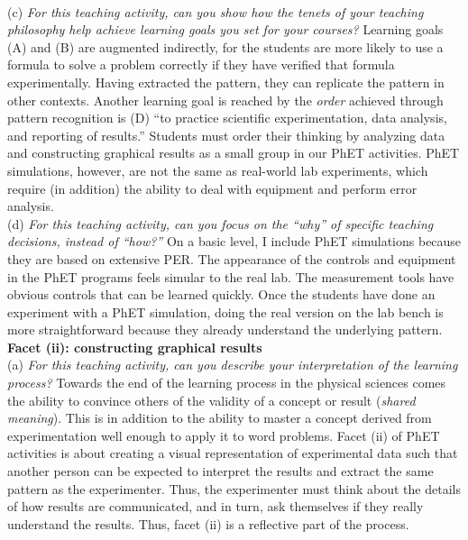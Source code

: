 \documentclass[../../../main.tex]{subfiles}
\begin{document}
\\
\vspace{0.25cm}
(c) \textit{For this teaching activity, can you show how the tenets of your teaching philosophy help achieve learning goals you
set for your courses?}  Learning goals (A) and (B) are augmented indirectly, for the students are more likely to use a formula to solve a problem correctly if they have verified that formula experimentally.  Having extracted the pattern, they can replicate the pattern in other contexts.  Another learning goal is reached by the \textit{order} achieved through pattern recognition is (D) ``to practice scientific experimentation, data analysis, and reporting of results.''  Students must order their thinking by analyzing data and constructing graphical results as a small group in our PhET activities.  PhET simulations, however, are not the same as real-world lab experiments, which require (in addition) the ability to deal with equipment and perform error analysis.
\\
\vspace{0.25cm}
(d) \textit{For this teaching activity, can you focus on the ``why'' of specific teaching decisions, instead of ``how?''}  On a basic level, I include PhET simulations because they are based on extensive PER.  The appearance of the controls and equipment in the PhET programs feels simular to the real lab.  The measurement tools have obvious controls that can be learned quickly.  Once the students have done an experiment with a PhET simulation, doing the real version on the lab bench is more straightforward because they already understand the underlying pattern.
\\
\vspace{0.25cm}
\textbf{Facet (ii): constructing graphical results}
\\
\vspace{0.25cm}
(a) \textit{For this teaching activity, can you describe your interpretation of the learning process?} Towards the end of the learning process in the physical sciences comes the ability to convince others of the validity of a concept or result (\textit{shared meaning}).  This is in addition to the ability to master a concept derived from experimentation well enough to apply it to word problems.  Facet (ii) of PhET activities is about creating a visual representation of experimental data such that another person can be expected to interpret the results and extract the same pattern as the experimenter.  Thus, the experimenter must think about the details of how results are communicated, and in turn, ask themselves if they really understand the results.  Thus, facet (ii) is a reflective part of the process.
\end{document}
